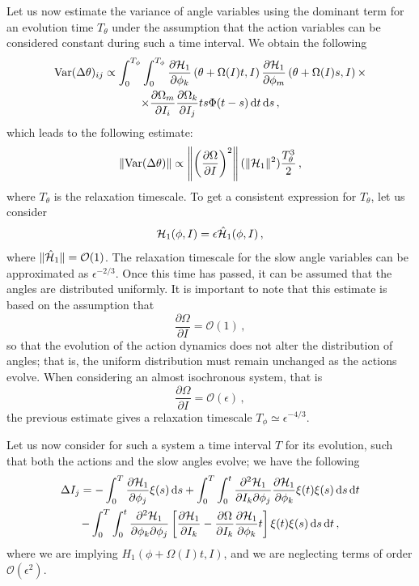 Let us now estimate the variance of angle variables using the dominant term for an evolution time $T_\theta$ under the assumption that the action variables can be considered constant during such a time interval. We obtain the following
\begin{multline}
    \operatorname{Var}(\Delta \theta)_{ij} \propto 
    \int_0^{T_\phi}\int_0^{T_\phi}  \pdv{\mathcal{H}_1}{\phi_k}\left(\theta+\Omega(I)t,I\right)
    \pdv{\mathcal{H}_1}{\phi_m}\left(\theta+\Omega(I)s,I\right)\times\\\times\pdv{\Omega_m}{I_i}\pdv{\Omega_k}{I_j} ts\Phi(t-s)\, \mathrm{d}t\, \mathrm{d}s \,,
\end{multline}
which leads to the following estimate:
\begin{equation}
    \left \Vert \textrm{Var}(\Delta \theta)\right \Vert\propto \left \Vert \left (\frac{\partial \Omega}{\partial I}\right )^2 \right \Vert (\Vert \mathcal{H}_1\Vert^2)\frac{T_\theta^3}{2}\,,
\end{equation}
where $T_\theta$ is the relaxation timescale. To get a consistent expression for $T_\theta$, let us consider
\begin{equation}
    \mathcal{H}_1(\phi,I)=\epsilon \hat {\mathcal{H}}_1(\phi, I)\,,
\end{equation}
where $\Vert \hat {\mathcal{H}}_1 \Vert=\mathcal{O}(1)$. The relaxation timescale for the slow angle variables can be approximated as $\epsilon^{-2/3}$. Once this time has passed, it can be assumed that the angles are distributed uniformly. It is important to note that this estimate is based on the assumption that
\begin{equation}
    \frac{\partial \Omega}{\partial I}=\mathcal{O}(1)\,,
\end{equation}
so that the evolution of the action dynamics does not alter the distribution of angles; that is, the uniform distribution must remain unchanged as the actions evolve. When considering an almost isochronous system, that is
\begin{equation}
    \frac{\partial \Omega}{\partial I}=\mathcal{O}(\epsilon) \,,
\end{equation}
the previous estimate gives a relaxation timescale $T_\phi\simeq \epsilon^{-4/3}$.

Let us now consider for such a system a time interval $T$ for its evolution, such that both the actions and the slow angles evolve; we have the following
\begin{multline}
    \Delta I_j = -\int_0^T\pdv{\mathcal{H}_1}{\phi_j}\xi(s)\,\mathrm{d}s + \int_0^T\int_0^t
    \frac{\partial^2 \mathcal{H}_1}{\partial I_k\partial \phi_j}\pdv{\mathcal{H}_1}{\phi_k}\xi(t)\xi(s)\,\mathrm{d}s\,\mathrm{d}t \\
    - \int_0^T\int_0^t \frac{\partial^2 \mathcal{H}_1}{\partial \phi_k\partial \phi_j} \left [\pdv{\mathcal{H}_1}{I_k}-\pdv{\Omega}{I_k}
    \pdv{\mathcal{H}_1}{\phi_k}t \right ] \xi(t)\xi(s)\,\mathrm{d}s\,\mathrm{d}t \,,
\end{multline}
where we are implying $H_1(\phi+\Omega(I)t,I)$, and we are neglecting terms of order $\mathcal{O}(\epsilon^2)$.

